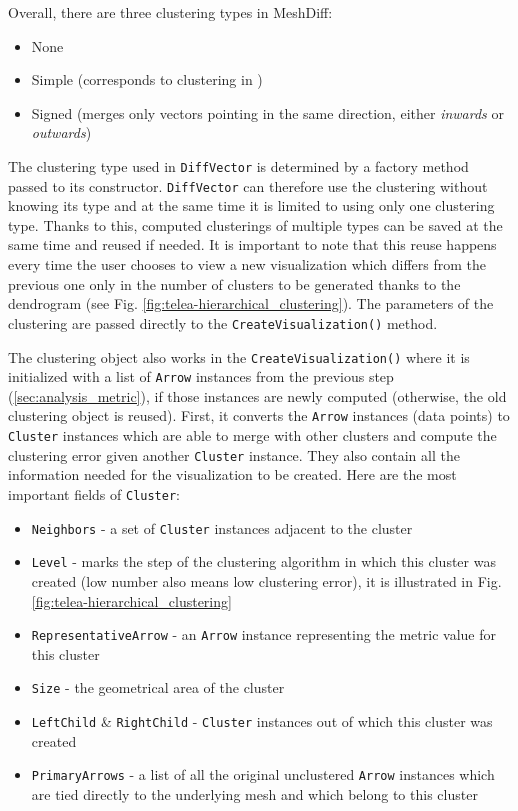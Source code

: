 Overall, there are three clustering types in MeshDiff:

\begin{itemize}
\item None
\item Simple (corresponds to clustering in \citet{Telea99})
\item Signed (merges only vectors pointing in the same direction, either {\it inwards} or {\it outwards})
\end{itemize}

The clustering type used in \verb+DiffVector+ is determined by a factory method passed to its constructor. \verb+DiffVector+ can therefore use the clustering without knowing its type and at the same time it is limited to using only one clustering type. Thanks to this, computed clusterings of multiple types can be saved at the same time and reused if needed. It is important to note that this reuse happens every time the user chooses to view a new visualization which differs from the previous one only in the number of clusters to be generated thanks to the dendrogram (see Fig. \ref{fig:telea-hierarchical_clustering}). The parameters of the clustering are passed directly to the \verb+CreateVisualization()+ method.

The clustering object also works in the \verb+CreateVisualization()+ where it is initialized with a list of \verb+Arrow+ instances from the previous step (\ref{sec:analysis_metric}), if those instances are newly computed (otherwise, the old clustering object is reused). First, it converts the \verb+Arrow+ instances (data points) to \verb+Cluster+ instances which are able to merge with other clusters and compute the clustering error given another \verb+Cluster+ instance. They also contain all the information needed for the visualization to be created. Here are the most important fields of \verb+Cluster+:

\begin{itemize}
\item \verb+Neighbors+ - a set of \verb+Cluster+ instances adjacent to the cluster
\item \verb+Level+ - marks the step of the clustering algorithm in which this cluster was created (low number also means low clustering error), it is illustrated in Fig. \ref{fig:telea-hierarchical_clustering}
\item \verb+RepresentativeArrow+ - an \verb+Arrow+ instance representing the metric value for this cluster
\item \verb+Size+ - the geometrical area of the cluster
\item \verb+LeftChild+ \& \verb+RightChild+ - \verb+Cluster+ instances out of which this cluster was created
\item \verb+PrimaryArrows+ - a list of all the original unclustered \verb+Arrow+ instances which are tied directly to the underlying mesh and which belong to this cluster
\end{itemize}

